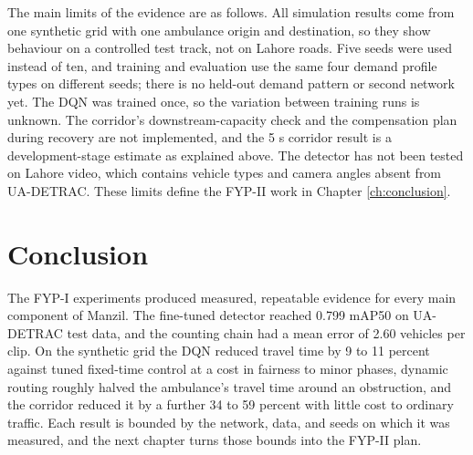 The main limits of the evidence are as follows. All simulation results come from one synthetic grid with one ambulance origin and destination, so they show behaviour on a controlled test track, not on Lahore roads. Five seeds were used instead of ten, and training and evaluation use the same four demand profile types on different seeds; there is no held-out demand pattern or second network yet. The DQN was trained once, so the variation between training runs is unknown. The corridor's downstream-capacity check and the compensation plan during recovery are not implemented, and the 5 s corridor result is a development-stage estimate as explained above. The detector has not been tested on Lahore video, which contains vehicle types and camera angles absent from UA-DETRAC. These limits define the FYP-II work in Chapter \ref{ch:conclusion}.

\section{Conclusion}

The FYP-I experiments produced measured, repeatable evidence for every main component of Manzil. The fine-tuned detector reached 0.799 mAP50 on UA-DETRAC test data, and the counting chain had a mean error of 2.60 vehicles per clip. On the synthetic grid the DQN reduced travel time by 9 to 11 percent against tuned fixed-time control at a cost in fairness to minor phases, dynamic routing roughly halved the ambulance's travel time around an obstruction, and the corridor reduced it by a further 34 to 59 percent with little cost to ordinary traffic. Each result is bounded by the network, data, and seeds on which it was measured, and the next chapter turns those bounds into the FYP-II plan.
